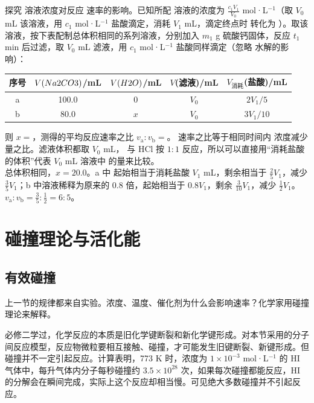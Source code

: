 \begin{liti}
探究  溶液浓度对反应  速率的影响。已知所配  溶液的浓度为 $\frac{c_1V_1}{V_0}$ mol·L$^{-1}$（取 $V_0$ mL 该溶液，用 $c_1$ mol·L$^{-1}$ 盐酸滴定，消耗 $V_1$ mL，滴定终点时  转化为 ）。取该  溶液，按下表配制总体积相同的系列溶液，分别加入 $m_1$ g 硫酸钙固体，反应 $t_1$ min 后过滤，取 $V_0$ mL 滤液，用 $c_1$ mol·L$^{-1}$ 盐酸同样滴定（忽略  水解的影响）：
\begin{center}\small
\begin{tabular}{ccccc}
\toprule
序号 & $V(Na2CO3)$/mL & $V(H2O)$/mL & $V$(滤液)/mL & $V_\text{消耗}$(盐酸)/mL \\
\midrule
a & 100.0 & 0 & $V_0$ & $2V_1/5$ \\
b & 80.0 & $x$ & $V_0$ & $3V_1/10$ \\
\bottomrule
\end{tabular}
\end{center}
则 $x=$\tk，测得的平均反应速率之比 $v_\text{a}:v_\text{b}=$\tk。
\tcblower
\silu 速率之比等于相同时间内  浓度减少量之比。滤液体积都取 $V_0$ mL， 与 HCl 按 $1:1$ 反应，所以可以直接用“消耗盐酸的体积”代表 $V_0$ mL 溶液中  的量来比较。\\
\jie 总体积相同，$x=20.0$。a 中  起始相当于消耗盐酸 $V_1$ mL，剩余相当于 $\frac25V_1$，减少 $\frac35V_1$；b 中溶液稀释为原来的 0.8 倍，起始相当于 $0.8V_1$，剩余 $\frac{3}{10}V_1$，减少 $\frac12V_1$。$v_\text{a}:v_\text{b}=\frac35:\frac12=6:5$。
\end{liti}

\section{碰撞理论与活化能}

\subsection{有效碰撞}
上一节的规律都来自实验。浓度、温度、催化剂为什么会影响速率？化学家用碰撞理论来解释。

必修二学过，化学反应的本质是旧化学键断裂和新化学键形成。对本节采用的分子间反应模型，反应物微粒要相互接触、碰撞，才可能发生旧键断裂、新键形成。但碰撞并不一定引起反应。计算表明，773 K 时，浓度为 $1\times10^{-3}$ mol·L$^{-1}$ 的 HI 气体中，每升气体内分子每秒碰撞约 $3.5\times10^{28}$ 次，如果每次碰撞都能反应，HI 的分解会在瞬间完成，实际上这个反应却相当慢。可见绝大多数碰撞并不引起反应。

